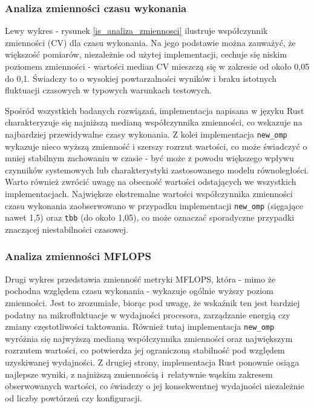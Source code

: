 \subsubsection{Analiza zmienności czasu wykonania}
Lewy wykres - rysunek \ref{is_analiza_zmiennosci} ilustruje współczynnik zmienności (CV) dla czasu wykonania. Na jego podstawie można zauważyć, że większość pomiarów, niezależnie od użytej implementacji, cechuje się niskim poziomem zmienności - wartości median CV mieszczą się w zakresie od około 0,05 do 0,1. Świadczy to o wysokiej powtarzalności wyników i braku istotnych fluktuacji czasowych w typowych warunkach testowych.

Spośród wszystkich badanych rozwiązań, implementacja napisana w języku Rust charakteryzuje się najniższą medianą współczynnika zmienności, co wskazuje na najbardziej przewidywalne czasy wykonania. Z kolei implementacja \texttt{new\_omp} wykazuje nieco wyższą zmienność i szerszy rozrzut wartości, co może świadczyć o mniej stabilnym zachowaniu w czasie - być może z powodu większego wpływu czynników systemowych lub charakterystyki zastosowanego modelu równoległości. Warto również zwrócić uwagę na obecność wartości odstających we wszystkich implementacjach. Największe ekstremalne wartości współczynnika zmienności czasu wykonania zaobserwowano w przypadku implementacji \texttt{new\_omp} (sięgające nawet 1,5) oraz \texttt{tbb} (do około 1,05), co może oznaczać sporadyczne przypadki znaczącej niestabilności czasowej.

\subsubsection{Analiza zmienności MFLOPS}
Drugi wykres przedstawia zmienność metryki MFLOPS, która - mimo że pochodna względem czasu wykonania - wykazuje ogólnie wyższy poziom zmienności. Jest to zrozumiałe, biorąc pod uwagę, że wskaźnik ten jest bardziej podatny na mikrofluktuacje w wydajności procesora, zarządzanie energią czy zmiany częstotliwości taktowania. Również tutaj implementacja \texttt{new\_omp} wyróżnia się najwyższą medianą współczynnika zmienności oraz największym rozrzutem wartości, co potwierdza jej ograniczoną stabilność pod względem uzyskiwanej wydajności. Z drugiej strony, implementacja Rust ponownie osiąga najlepsze wyniki, z najniższą zmiennością i~relatywnie wąskim zakresem obserwowanych wartości, co świadczy o jej konsekwentnej wydajności niezależnie od liczby powtórzeń czy konfiguracji.

